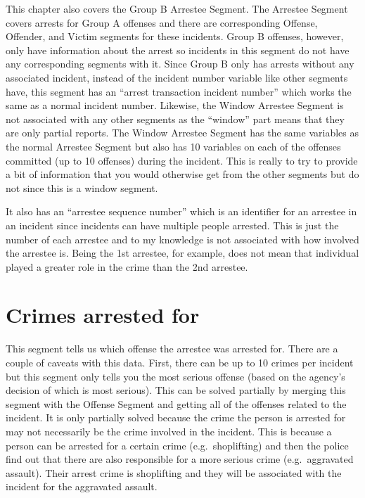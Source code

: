 \documentclass[
]{krantz}
\begin{document}
This chapter also covers the Group B Arrestee Segment. The
Arrestee Segment covers arrests for Group A offenses and
there are corresponding Offense, Offender, and Victim
segments for these incidents. Group B offenses, however,
only have information about the arrest so incidents in this
segment do not have any corresponding segments with it.
Since Group B only has arrests without any associated
incident, instead of the incident number variable like other
segments have, this segment has an ``arrest transaction
incident number'' which works the same as a normal incident
number. Likewise, the Window Arrestee Segment is not
associated with any other segments as the ``window'' part
means that they are only partial reports. The Window
Arrestee Segment has the same variables as the normal
Arrestee Segment but also has 10 variables on each of the
offenses committed (up to 10 offenses) during the incident.
This is really to try to provide a bit of information that
you would otherwise get from the other segments but do not
since this is a window segment.

It also has an ``arrestee sequence number'' which is an
identifier for an arrestee in an incident since incidents
can have multiple people arrested. This is just the number
of each arrestee and to my knowledge is not associated with
how involved the arrestee is. Being the 1st arrestee, for
example, does not mean that individual played a greater role
in the crime than the 2nd arrestee.

\section{Crimes arrested for}\label{crimes-arrested-for}

This segment tells us which offense the arrestee was
arrested for. There are a couple of caveats with this data.
First, there can be up to 10 crimes per incident but this
segment only tells you the most serious offense (based on
the agency's decision of which is most serious). This can be
solved partially by merging this segment with the Offense
Segment and getting all of the offenses related to the
incident. It is only partially solved because the crime the
person is arrested for may not necessarily be the crime
involved in the incident. This is because a person can be
arrested for a certain crime (e.g.~shoplifting) and then the
police find out that there are also responsible for a more
serious crime (e.g.~aggravated assault). Their arrest crime
is shoplifting and they will be associated with the incident
for the aggravated assault.
\end{document}
